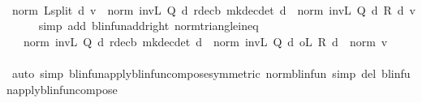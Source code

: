 \begin{isabellebody}
\isatagproof
{}\isamarkupfalse%
\ {\isacharminus}{\kern0pt}\isanewline
\ \ \isamarkupfalse%
\ {\isachardoublequoteopen}norm\ {\isacharparenleft}{\kern0pt}L{\isacharunderscore}{\kern0pt}split\ d\ v{\isacharparenright}{\kern0pt}\ {\isasymle}\ norm\ {\isacharparenleft}{\kern0pt}inv\isactrlsub L\ {\isacharparenleft}{\kern0pt}Q\ d{\isacharparenright}{\kern0pt}\ {\isacharparenleft}{\kern0pt}r{\isacharunderscore}{\kern0pt}dec\isactrlsub b\ {\isacharparenleft}{\kern0pt}mk{\isacharunderscore}{\kern0pt}dec{\isacharunderscore}{\kern0pt}det\ d{\isacharparenright}{\kern0pt}{\isacharparenright}{\kern0pt}{\isacharparenright}{\kern0pt}\ {\isacharplus}{\kern0pt}\ norm\ {\isacharparenleft}{\kern0pt}inv\isactrlsub L\ {\isacharparenleft}{\kern0pt}Q\ d{\isacharparenright}{\kern0pt}\ {\isacharparenleft}{\kern0pt}R\ d\ v{\isacharparenright}{\kern0pt}{\isacharparenright}{\kern0pt}{\isachardoublequoteclose}\isanewline
\ \ \ \ \isamarkupfalse%
\ {\isacharparenleft}{\kern0pt}simp\ add{\isacharcolon}{\kern0pt}\ blinfun{\isachardot}{\kern0pt}add{\isacharunderscore}{\kern0pt}right\ norm{\isacharunderscore}{\kern0pt}triangle{\isacharunderscore}{\kern0pt}ineq{\isacharparenright}{\kern0pt}\isanewline
\ \ \isamarkupfalse%
\ \isamarkupfalse%
\ {\isachardoublequoteopen}{\isasymdots}\ {\isasymle}\ norm\ {\isacharparenleft}{\kern0pt}inv\isactrlsub L\ {\isacharparenleft}{\kern0pt}Q\ d{\isacharparenright}{\kern0pt}\ {\isacharparenleft}{\kern0pt}r{\isacharunderscore}{\kern0pt}dec\isactrlsub b\ {\isacharparenleft}{\kern0pt}mk{\isacharunderscore}{\kern0pt}dec{\isacharunderscore}{\kern0pt}det\ d{\isacharparenright}{\kern0pt}{\isacharparenright}{\kern0pt}{\isacharparenright}{\kern0pt}\ {\isacharplus}{\kern0pt}\ norm\ {\isacharparenleft}{\kern0pt}inv\isactrlsub L\ {\isacharparenleft}{\kern0pt}Q\ d{\isacharparenright}{\kern0pt}\ o\isactrlsub L\ R\ d{\isacharparenright}{\kern0pt}\ {\isacharasterisk}{\kern0pt}\ norm\ v{\isachardoublequoteclose}\ \ \ \ \isanewline
\ \ \ \ \isamarkupfalse%
\ {\isacharparenleft}{\kern0pt}auto\ simp{\isacharcolon}{\kern0pt}\ blinfun{\isacharunderscore}{\kern0pt}apply{\isacharunderscore}{\kern0pt}blinfun{\isacharunderscore}{\kern0pt}compose{\isacharbrackleft}{\kern0pt}symmetric{\isacharbrackright}{\kern0pt}\ norm{\isacharunderscore}{\kern0pt}blinfun\ simp\ del{\isacharcolon}{\kern0pt}\ blinfun{\isacharunderscore}{\kern0pt}apply{\isacharunderscore}{\kern0pt}blinfun{\isacharunderscore}{\kern0pt}compose{\isacharparenright}{\kern0pt}\isanewline
\ \ \isamarkupfalse%

\end{isabellebody}

